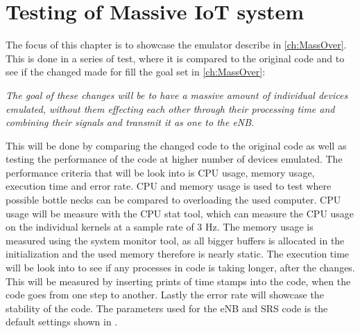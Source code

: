 \chapter{Testing of Massive IoT system} \label{ch:mass_test}
The focus of this chapter is to showcase the emulator describe in \autoref{ch:MassOver}. This is done in a series of test, where it is compared to the original code and to see if the changed made for fill the goal set in \autoref{ch:MassOver}:

\textit{The goal of these changes will be to have a massive amount of individual devices emulated, without them effecting each other through their processing time and combining their signals and transmit it as one to the eNB.}

This will be done by comparing the changed code to the original code as well as testing the performance of the code at higher number of devices emulated.
The performance criteria that will be look into is CPU usage, memory usage, execution time and error rate.
CPU and memory usage is used to test where possible bottle necks can be compared to overloading the used computer. CPU usage will be measure with the CPU stat tool, which can measure the CPU usage on the individual kernels at a sample rate of 3 Hz. The memory usage is measured using the system monitor tool, as all bigger buffers is allocated in the initialization and the used memory therefore is nearly static. The execution time will be look into to see if any processes in code is taking longer, after the changes. This will be measured by inserting prints of time stamps into the code, when the code goes from one step to another. Lastly the error rate will showcase the stability of the code.
The parameters used for the eNB and SRS code is the default settings shown in .
